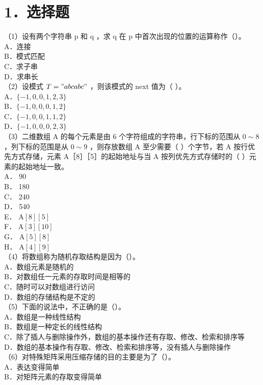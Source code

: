 \documentclass[10pt]{article}
\begin{document}
\section*{1．选择题}
（1）设有两个字符串 p 和 q ，求 q 在 p 中首次出现的位置的运算称作（）。\\
A．连接\\
B．模式匹配\\
C．求子串\\
D．求串长\\
（2）设模式 $T=" a b c a b c "$ ，则该模式的 next 值为（ ）。\\
A．$\{-1,0,0,1,2,3\}$\\
B．$\{-1,0,0,0,1,2\}$\\
C．$\{-1,0,0,1,1,2\}$\\
D．$\{-1,0,0,0,2,3\}$\\
（3）二维数组 A 的每个元素是由 6 个字符组成的字符串，行下标的范围从 $0 \sim 8$ ，列下标的范围是从 $0 \sim 9$ ，则存放数组 A 至少需要（ ）个字节，若 A 按行优先方式存储，元素 A［8］［5］的起始地址与当 A 按列优先方式存储时的（ ）元素的起始地址一致。\\
A． 90\\
B． 180\\
C． 240\\
D． 540\\
E． $\mathrm{A}[8][5]$\\
F． $\mathrm{A}[3][10]$\\
G． $\mathrm{A}[5][8]$\\
H． $\mathrm{A}[4][9]$\\
（4）将数组称为随机存取结构是因为（）。\\
A．数组元素是随机的\\
B．对数组任一元素的存取时间是相等的\\
C．随时可以对数组进行访问\\
D．数组的存储结构是不定的\\
（5）下面的说法中，不正确的是（）。\\
A．数组是一种线性结构\\
B．数组是一种定长的线性结构\\
C．除了插人与删除操作外，数组的基本操作还有存取、修改、检索和排序等\\
D．数组的基本操作有存取、修改、检索和排序等，没有插人与删除操作\\
（6）对特殊矩阵采用压缩存储的目的主要是为了（）。\\
A．表达变得简单\\
B．对矩阵元素的存取变得简单\\
\end{document}
